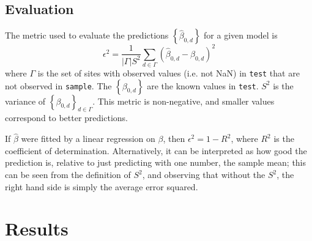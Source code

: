 \documentclass{article} %
\begin{document}
\subsection{Evaluation}

The metric used to evaluate the predictions $\left\{ \hat{\beta}_{0,d}\right\}$ for a given model is 
\begin{equation} \label{metric}
\epsilon^2 = \frac{ 1}{|\Gamma| S^{2}} \sum_{d \in \Gamma} \left( \hat{\beta}_{0,d} -  \beta_{0,d}\right)^2 
\end{equation}
where $\Gamma$ is the set of sites with observed values (i.e. not NaN) in \texttt{test} that are not observed in \texttt{sample}. The $\left\{\beta_{0,d}\right\}$ are the known values in \texttt{test}. $S^2$ is the variance of $\left\{\beta_{0,d}\right\}_{d \in \Gamma}$. This metric is non-negative, and smaller values correspond to better predictions.

If $\hat{\beta}$ were fitted by a linear regression on $\beta$, then $\epsilon^2 = 1 - R^2$, where $R^2$ is the coefficient of determination. Alternatively, it can be interpreted as how good the prediction is, relative to just predicting with one number, the sample mean; this can be seen from the definition of $S^2$, and observing that without the $S^2$, the right hand side is simply the average error squared.

\section{Results}
\end{document}
